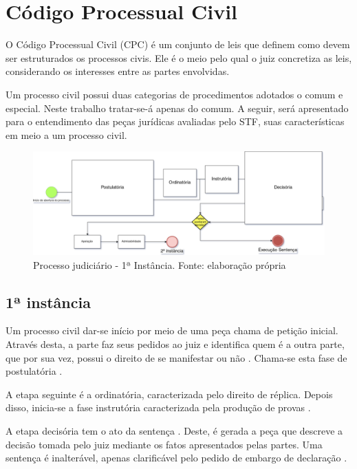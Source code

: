 \section{Código Processual Civil}

O Código Processual Civil (CPC) é um conjunto de leis que definem como devem ser estruturados os processos civis. Ele é o meio pelo qual o juiz concretiza as leis, considerando os interesses entre as partes envolvidas.

Um processo civil possui duas categorias de procedimentos adotados o comum e especial. Neste trabalho tratar-se-á apenas do comum. A seguir, será apresentado para o entendimento das peças jurídicas avaliadas pelo STF, suas características em meio a um processo civil.

\begin{figure}[h]
	\centering
    \includegraphics[keepaspectratio=true,scale=0.4]{figuras/processoPrimeira}
	\caption[Processo judiciário - 1ª Instância]{Processo judiciário - 1ª Instância. Fonte: elaboração própria}
	\label{fig:processoPrimeira}
\end{figure}

\subsection{1ª instância}

Um processo civil dar-se início por meio de uma peça chama de petição inicial. Através desta, a parte faz seus pedidos ao juiz e identifica quem é a outra parte, que por sua vez, possui o direito de se manifestar ou não \cite{BRASIL2015}. Chama-se esta fase de postulatória \cite{GONCALVES2016}.

A etapa seguinte é a ordinatória, caracterizada pelo direito de réplica. Depois disso, inicia-se a fase instrutória caracterizada pela produção de provas \cite{GONCALVES2016}.

A etapa decisória tem o ato da sentença \cite{GONCALVES2016}. Deste, é gerada a peça que descreve a decisão tomada pelo juiz mediante os fatos apresentados pelas partes. Uma sentença é inalterável, apenas clarificável pelo pedido de embargo de declaração \cite{BRASIL2015}.

